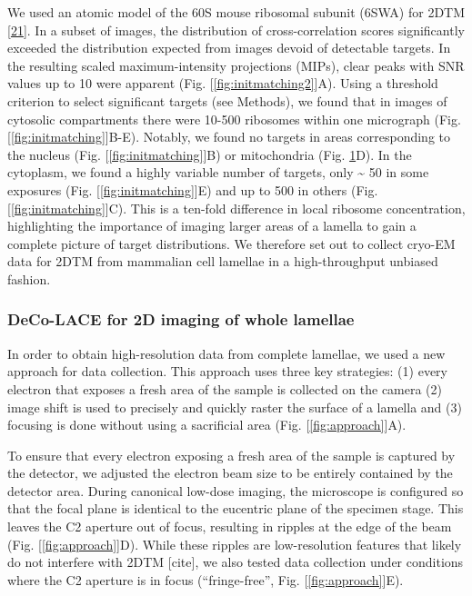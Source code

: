 \documentclass[
]{article}
\begin{document}
We used an atomic model of the 60S mouse ribosomal subunit (6SWA) for 2DTM {[}\protect\hyperlink{ref-sbkam02a}{21}{]}. In a
subset of images, the distribution of cross-correlation scores significantly
exceeded the distribution expected from images devoid of detectable targets. In the
resulting scaled maximum-intensity projections (MIPs), clear peaks with SNR
values up to 10 were apparent (Fig. {[}\ref{fig:initmatching2}{]}A). Using a
threshold criterion to select significant targets (see Methods), we found that in
images of cytosolic compartments there were 10-500 ribosomes within one micrograph
(Fig. {[}\ref{fig:initmatching}{]}B-E). Notably, we found no targets in areas
corresponding to the nucleus (Fig. {[}\ref{fig:initmatching}{]}B) or mitochondria
(Fig. \protect\hyperlink{fig:initmatching}{1}D). In the cytoplasm, we found a highly variable
number of targets, only \textasciitilde{} 50 in some exposures (Fig. {[}\ref{fig:initmatching}{]}E) and
up to 500 in others (Fig. {[}\ref{fig:initmatching}{]}C). This is a ten-fold
difference in local ribosome concentration, highlighting the importance of
imaging larger areas of a lamella to gain a complete picture of target
distributions. We therefore set out to collect cryo-EM data for 2DTM from
mammalian cell lamellae in a high-throughput unbiased fashion.

\hypertarget{deco-lace-for-2d-imaging-of-whole-lamellae}{%
\subsubsection{DeCo-LACE for 2D imaging of whole lamellae}\label{deco-lace-for-2d-imaging-of-whole-lamellae}}

In order to obtain high-resolution data from complete lamellae, we used a new
approach for data collection. This approach uses three key strategies: (1) every
electron that exposes a fresh area of the sample is collected on the camera (2)
image shift is used to precisely and quickly raster the surface of a lamella and
(3) focusing is done without using a sacrificial area (Fig. {[}\ref{fig:approach}{]}A).

To ensure that every electron exposing a fresh area of the sample is captured by
the detector, we adjusted the electron beam size to be entirely contained by the
detector area. During canonical low-dose imaging, the microscope is configured so
that the focal plane is identical to the eucentric plane of the specimen stage.
This leaves the C2 aperture out of focus, resulting in ripples at the edge of
the beam (Fig. {[}\ref{fig:approach}{]}D). While these ripples are low-resolution
features that likely do not interfere with 2DTM {[}cite{]}, we also tested data
collection under conditions where the C2 aperture is in focus (``fringe-free'',
Fig. {[}\ref{fig:approach}{]}E).
\end{document}
